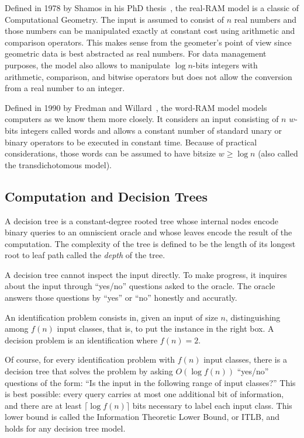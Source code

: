 Defined in 1978 by Shamos in his PhD thesis~\cite[Section~2.3]{Sha78},
the real-RAM model is a classic of Computational Geometry. The input is assumed
to consist of \(n\) real numbers and those numbers can be manipulated
exactly at constant cost using arithmetic and comparison operators.
This makes sense from the geometer's point of view since geometric data is
best abstracted as real numbers.
For data management purposes, the model also allows to manipulate \(\log
n\)-bits integers with arithmetic, comparison, and bitwise operators but does
not allow the conversion from a real number to an integer.

Defined in 1990 by Fredman and Willard~\cite{FW90},
the word-RAM model models computers as we know them more closely. It considers
an input consisting of \(n\) \(w\)-bits integers called words and allows a
constant number of standard unary or binary operators to be executed in
constant time.
%
Because of practical considerations,
those words can be assumed to have bitsize \(w \geq \log n\) (also called the
transdichotomous model).

\subsection{Computation and Decision Trees}%
\label{sec:models-of-computation:algorithms:trees}

A decision tree is a constant-degree rooted tree whose internal nodes encode
binary queries to an omniscient oracle and whose leaves encode the result of the
computation. The complexity of the tree is defined to be the length of
its longest root to leaf path called the \emph{depth} of the tree.

A decision tree cannot inspect the input directly.
To make progress, it inquires about the input through ``yes/no'' questions
asked to the oracle. The oracle answers those questions by ``yes'' or ``no''
honestly and accuratly.

An identification problem consists in, given an input of size \(n\),
distinguishing among \(f(n)\) input classes, that is, to put the instance in
the right box. A decision problem is an identification where \(f(n) = 2\).

Of course, for every identification problem with \(f(n)\) input classes,
there is a decision tree that solves the problem by asking
\(O(\log f(n))\) ``yes/no'' questions of the form:
``Is the input in the following range of input classes?''
%
This is best possible: every query carries at most one additional bit of
information, and there are at least \(\lceil \log f(n) \rceil\) bits necessary
to label each input class. This lower bound is called the Information Theoretic
Lower Bound, or ITLB, and holds for any decision tree model.

